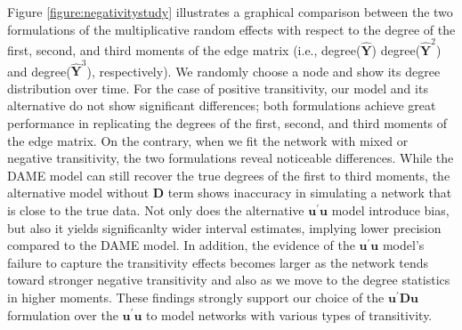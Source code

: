 \documentclass[a4paper]{article}
\begin{document}
Figure \ref{figure:negativitystudy} illustrates a graphical comparison between the two formulations of the multiplicative random effects with respect to the degree of the first, second, and third moments of the edge matrix (i.e., degree($\hat{\mathbf{Y}}$) degree($\hat{\mathbf{Y}}^2$) and degree($\hat{\mathbf{Y}}^3$), respectively). We randomly choose a node and show its degree distribution over time. For the case of positive transitivity, our model and its alternative do not show significant differences; both formulations achieve great performance in replicating the degrees of the first, second, and third moments of the edge matrix. On the contrary, when we fit the network with mixed or negative transitivity, the two formulations reveal noticeable differences. While the DAME model can still recover the true degrees of the first to third moments, the alternative model without $\mathbf{D}$ term shows inaccuracy in simulating a network that is close to the true data. Not only does the alternative $\boldsymbol{u}^\prime \boldsymbol{u}$ model introduce bias, but also it yields significanlty wider interval estimates, implying lower precision compared to the DAME model. In addition, the evidence of the $\boldsymbol{u}^\prime \boldsymbol{u}$ model's failure to capture the transitivity effects becomes larger as the network tends toward stronger negative transitivity and also as we move to the degree statistics in higher moments. These findings strongly support our choice of the $\boldsymbol{u}^\prime \mathbf{D}\boldsymbol{u}$ formulation over the $\boldsymbol{u}^\prime \boldsymbol{u}$ to model networks with various types of transitivity.
\end{document}
